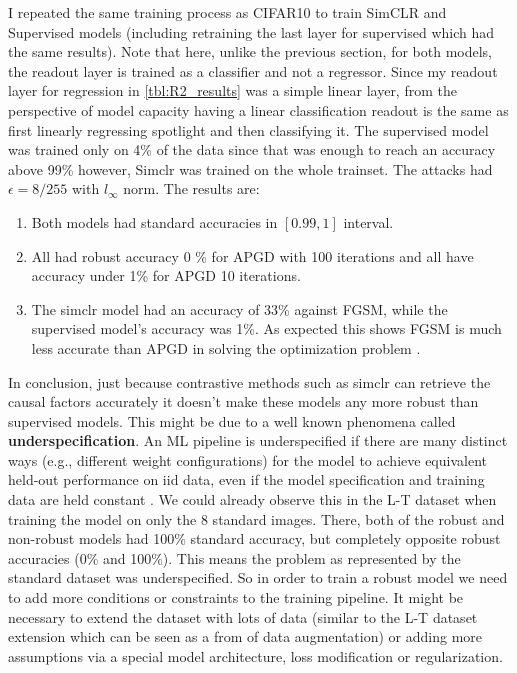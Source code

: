 \documentclass[../thesis.tex]{subfiles}
\begin{document}
I repeated the same training process as CIFAR10 to train SimCLR and Supervised models (including retraining the last layer for supervised which had the same results). Note that here, unlike the previous section, for both models, the readout layer is trained as a classifier and not a regressor. Since my readout layer for regression in \ref{tbl:R2_results} was a simple linear layer, from the perspective of model capacity having a linear classification readout is the same as first linearly regressing spotlight and then classifying it. The supervised model was trained only on 4\% of the data since that was enough to reach an accuracy above 99\% however, Simclr was trained on the whole trainset. The attacks had $\epsilon = 8/255$ with $l_{\infty}$ norm. The results are:


 \begin{enumerate}
 	\item Both models had standard accuracies in $[0.99,1]$ interval.
 	
 	\item All had robust accuracy 0 \% for APGD with 100 iterations and all have accuracy under 1\% for APGD 10 iterations.
 	
 	\item The simclr model had an accuracy of 33\% against FGSM, while the supervised model's accuracy was 1\%. As expected this shows FGSM is much less accurate than APGD in solving the optimization problem .
 	
 \end{enumerate}

In conclusion, just because contrastive methods such as simclr can retrieve the causal factors accurately it doesn't make these models any more robust than supervised models. This might be due to a well known phenomena called \textbf{underspecification}. An ML
pipeline is underspecified if there are many distinct ways (e.g., different weight configurations) for
the model to achieve equivalent held-out performance on iid data, even if the model specification and
training data are held constant \cite{underspecification}. We could already observe this in the L-T dataset when training the model on only the 8 standard images. There, both of the robust and non-robust models had 100\% standard accuracy, but completely opposite robust accuracies (0\% and 100\%). This means the problem as represented by the standard dataset was underspecified. So in order to train a robust model we need to add more conditions or constraints to the training pipeline. It might be necessary to extend the dataset with lots of data (similar to the L-T dataset extension which can be seen as a from of data augmentation) or adding more assumptions via a special model architecture, loss modification or regularization.  
 
\end{document}
